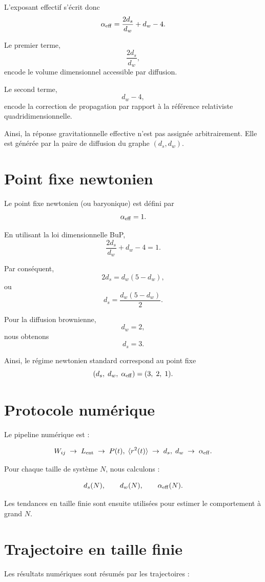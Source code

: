 \documentclass[11pt,a4paper]{article}
\begin{document}
L'exposant effectif s'écrit donc
\[
\alpha_{\rm eff} = \frac{2d_s}{d_w} + d_w - 4.
\]

Le premier terme,
\[
\frac{2d_s}{d_w},
\]
encode le volume dimensionnel accessible par diffusion.

Le second terme,
\[
d_w - 4,
\]
encode la correction de propagation par rapport à la référence relativiste quadridimensionnelle.

Ainsi, la réponse gravitationnelle effective n'est pas assignée arbitrairement. Elle est générée par la paire de diffusion du graphe \((d_s, d_w)\).

\section{Point fixe newtonien}

Le point fixe newtonien (ou baryonique) est défini par
\[
\alpha_{\rm eff} = 1.
\]

En utilisant la loi dimensionnelle BuP,
\[
\frac{2d_s}{d_w} + d_w - 4 = 1.
\]

Par conséquent,
\[
2d_s = d_w (5 - d_w),
\]
ou
\[
d_s = \frac{d_w (5 - d_w)}{2}.
\]

Pour la diffusion brownienne,
\[
d_w = 2,
\]
nous obtenons
\[
d_s = 3.
\]

Ainsi, le régime newtonien standard correspond au point fixe
\[
(d_s,\; d_w,\; \alpha_{\rm eff}) = (3,\; 2,\; 1).
\]

\section{Protocole numérique}

Le pipeline numérique est :

\[
W_{ij}
\;\rightarrow\;
L_{\rm ent}
\;\rightarrow\;
P(t),\; \langle r^2(t) \rangle
\;\rightarrow\;
d_s,\; d_w
\;\rightarrow\;
\alpha_{\rm eff}.
\]

Pour chaque taille de système \(N\), nous calculons :

\[
d_s(N), \qquad d_w(N), \qquad \alpha_{\rm eff}(N).
\]

Les tendances en taille finie sont ensuite utilisées pour estimer le comportement à grand \(N\).

\section{Trajectoire en taille finie}

Les résultats numériques sont résumés par les trajectoires :
\end{document}
